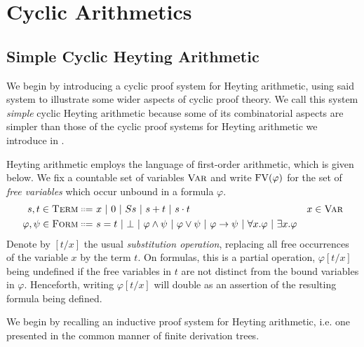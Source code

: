 
\chapter{Cyclic Arithmetics}
\label{chap:ca}

\section{Simple Cyclic Heyting Arithmetic}
\label{sec:cha}

We begin by introducing a cyclic proof system for Heyting arithmetic, using
said system to illustrate some wider aspects of cyclic proof theory. We call
this system \emph{simple} cyclic Heyting arithmetic because some of its
combinatorial aspects are simpler than those of the cyclic proof systems for
Heyting arithmetic we introduce in .

Heyting arithmetic employs the language of first-order arithmetic,
which is given below. We fix a countable set of variables $\textsc{Var}$ and write
$\mathrm{FV}(\varphi)$ for the set of \emph{free variables} which occur unbound in a
formula $\varphi$.
\begin{align*}
  s,t \in \term \langeq~& x ~|~ 0 ~|~ S s ~|~ s + t ~|~ s \cdot t  & x \in \var \\
  \varphi, \psi \in \form \langeq~& s = t ~|~ \bot ~|~ \varphi \wedge \psi ~|~ \varphi \vee \psi ~|~ \varphi \to \psi ~|~ \forall x.\varphi ~|~ \exists x. \varphi
\end{align*}
Denote by $[t / x]$ the usual \emph{substitution operation}, replacing all free
occurrences of the variable $x$ by the term $t$. On formulas, this is a partial
operation, $\varphi[t / x]$ being undefined if the free variables in $t$ are not
distinct from the bound variables in $\varphi$. Henceforth, writing $\varphi[t /
x]$ will double as an assertion of the resulting formula being defined.

We begin by recalling an inductive proof system for Heyting arithmetic, i.e. one
presented in the common manner of finite derivation trees.


